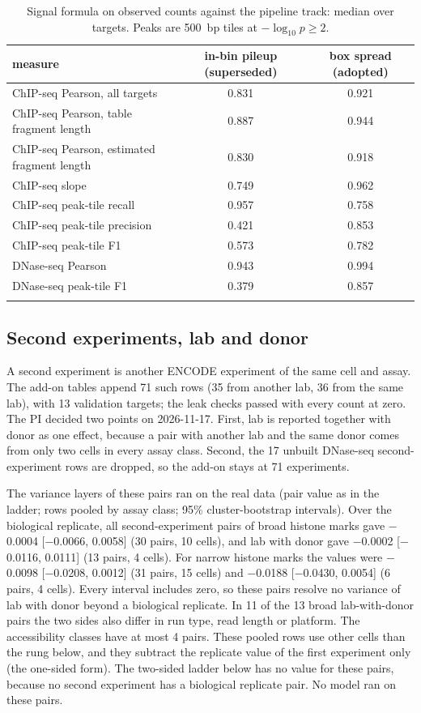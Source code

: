 \documentclass[pdflatex,sn-mathphys-num]{sn-jnl}
\newcommand{\lit}[1]{#1}
\newcommand{\cl}[1]{#1}
\newcommand{\TabFormula}{ChIP-seq Pearson, all targets & 0.831 & 0.921 \\
ChIP-seq Pearson, table fragment length & 0.887 & 0.944 \\
ChIP-seq Pearson, estimated fragment length & 0.830 & 0.918 \\
ChIP-seq slope & 0.749 & 0.962 \\
ChIP-seq peak-tile recall & 0.957 & 0.758 \\
ChIP-seq peak-tile precision & 0.421 & 0.853 \\
ChIP-seq peak-tile F1 & 0.573 & 0.782 \\
DNase-seq Pearson & 0.943 & 0.994 \\
DNase-seq peak-tile F1 & 0.379 & 0.857 \\}
\newcommand{\dTwoBrAll}{\ensuremath{-}0.0004}
\newcommand{\dTwoBrAllC}{10}
\newcommand{\dTwoBrAllHi}{0.0058}
\newcommand{\dTwoBrAllLo}{\ensuremath{-}0.0066}
\newcommand{\dTwoBrAllN}{30}
\newcommand{\dTwoBrLd}{\ensuremath{-}0.0002}
\newcommand{\dTwoBrLdC}{4}
\newcommand{\dTwoBrLdHi}{0.0111}
\newcommand{\dTwoBrLdLo}{\ensuremath{-}0.0116}
\newcommand{\dTwoBrLdN}{13}
\newcommand{\dTwoBrLdTech}{11}
\newcommand{\dTwoDropped}{17}
\newcommand{\dTwoKept}{71}
\newcommand{\dTwoNrAll}{\ensuremath{-}0.0098}
\newcommand{\dTwoNrAllC}{15}
\newcommand{\dTwoNrAllHi}{0.0012}
\newcommand{\dTwoNrAllLo}{\ensuremath{-}0.0208}
\newcommand{\dTwoNrAllN}{31}
\newcommand{\dTwoNrLd}{\ensuremath{-}0.0188}
\newcommand{\dTwoNrLdC}{4}
\newcommand{\dTwoNrLdHi}{0.0054}
\newcommand{\dTwoNrLdLo}{\ensuremath{-}0.0430}
\newcommand{\dTwoNrLdN}{6}
\newcommand{\dTwoSmall}{4}
\newcommand{\nSecond}{71}
\newcommand{\nSecondOther}{35}
\newcommand{\nSecondSame}{36}
\newcommand{\nSecondVal}{13}
\begin{document}
\begin{table}[!htbp]
\caption{\cl{Signal formula on observed counts against the pipeline track: median over targets. Peaks are \lit{500}~bp tiles at $-\log_{\lit{10}} p \ge \lit{2}$.}}\label{tab:formula}
\footnotesize
\begin{tabular}{lcc}
\toprule
measure & in-bin pileup (superseded) & box spread (adopted) \\
\midrule
\TabFormula
\botrule
\end{tabular}
\end{table}

\subsection{Second experiments, lab and donor}

\cl{A second experiment is another ENCODE experiment of the same cell and assay. The add-on tables append \nSecond{} such rows (\nSecondOther{} from another lab, \nSecondSame{} from the same lab), with \nSecondVal{} validation targets; the leak checks passed with every count at zero. The PI decided two points on \lit{2026-11-17}. First, lab is reported together with donor as one effect, because a pair with another lab and the same donor comes from only two cells in every assay class. Second, the \dTwoDropped{} unbuilt DNase-seq second-experiment rows are dropped, so the add-on stays at \dTwoKept{} experiments.}

\cl{The variance layers of these pairs ran on the real data (pair value as in the ladder; rows pooled by assay class; \lit{95}\% cluster-bootstrap intervals). Over the biological replicate, all second-experiment pairs of broad histone marks gave \dTwoBrAll{} [\dTwoBrAllLo{}, \dTwoBrAllHi{}] (\dTwoBrAllN{} pairs, \dTwoBrAllC{} cells), and lab with donor gave \dTwoBrLd{} [\dTwoBrLdLo{}, \dTwoBrLdHi{}] (\dTwoBrLdN{} pairs, \dTwoBrLdC{} cells). For narrow histone marks the values were \dTwoNrAll{} [\dTwoNrAllLo{}, \dTwoNrAllHi{}] (\dTwoNrAllN{} pairs, \dTwoNrAllC{} cells) and \dTwoNrLd{} [\dTwoNrLdLo{}, \dTwoNrLdHi{}] (\dTwoNrLdN{} pairs, \dTwoNrLdC{} cells). Every interval includes zero, so these pairs resolve no variance of lab with donor beyond a biological replicate. In \dTwoBrLdTech{} of the \dTwoBrLdN{} broad lab-with-donor pairs the two sides also differ in run type, read length or platform. The accessibility classes have at most \dTwoSmall{} pairs. These pooled rows use other cells than the rung below, and they subtract the replicate value of the first experiment only (the one-sided form). The two-sided ladder below has no value for these pairs, because no second experiment has a biological replicate pair. No model ran on these pairs.}
\end{document}
